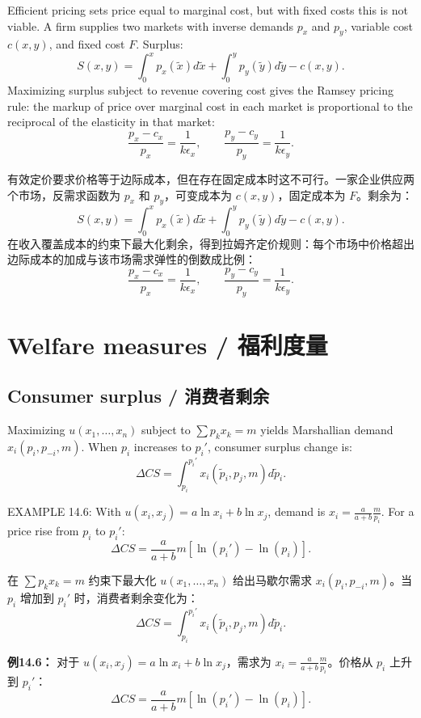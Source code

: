 \begin{original}
Efficient pricing sets price equal to marginal cost, but with fixed costs this is not viable. A firm supplies two markets with inverse demands $p_x$ and $p_y$, variable cost $c(x, y)$, and fixed cost $F$. Surplus:
\[
S(x, y) = \int_0^x p_x(\tilde{x})d\tilde{x} + \int_0^y p_y(\tilde{y})d\tilde{y} - c(x, y).
\]
Maximizing surplus subject to revenue covering cost gives the Ramsey pricing rule: the markup of price over marginal cost in each market is proportional to the reciprocal of the elasticity in that market:
\[
\frac{p_x - c_x}{p_x} = \frac{1}{k \epsilon_x}, \qquad \frac{p_y - c_y}{p_y} = \frac{1}{k \epsilon_y}.
\]
\end{original}
\begin{translation}
有效定价要求价格等于边际成本，但在存在固定成本时这不可行。一家企业供应两个市场，反需求函数为 $p_x$ 和 $p_y$，可变成本为 $c(x, y)$，固定成本为 $F$。剩余为：
\[
S(x, y) = \int_0^x p_x(\tilde{x})d\tilde{x} + \int_0^y p_y(\tilde{y})d\tilde{y} - c(x, y).
\]
在收入覆盖成本的约束下最大化剩余，得到拉姆齐定价规则：每个市场中价格超出边际成本的加成与该市场需求弹性的倒数成比例：
\[
\frac{p_x - c_x}{p_x} = \frac{1}{k \epsilon_x}, \qquad \frac{p_y - c_y}{p_y} = \frac{1}{k \epsilon_y}.
\]
\end{translation}

\section{Welfare measures / 福利度量}

\subsection{Consumer surplus / 消费者剩余}

\begin{original}
Maximizing $u(x_1,\dots, x_n)$ subject to $\sum p_k x_k = m$ yields Marshallian demand $x_i(p_i, p_{-i}, m)$. When $p_i$ increases to $p_i'$, consumer surplus change is:
\[
\Delta CS = \int_{p_i}^{p_i'} x_i(\tilde{p}_i, p_j, m) d\tilde{p}_i. \tag{14.8}
\]

EXAMPLE 14.6: With $u(x_i, x_j) = a\ln x_i + b\ln x_j$, demand is $x_i = \frac{a}{a+b}\frac{m}{p_i}$. For a price rise from $p_i$ to $p_i'$:
\[
\Delta CS = \frac{a}{a+b}m[\ln(p_i') - \ln(p_i)].
\]
\end{original}
\begin{translation}
在 $\sum p_k x_k = m$ 约束下最大化 $u(x_1,\dots, x_n)$ 给出马歇尔需求 $x_i(p_i, p_{-i}, m)$。当 $p_i$ 增加到 $p_i'$ 时，消费者剩余变化为：
\[
\Delta CS = \int_{p_i}^{p_i'} x_i(\tilde{p}_i, p_j, m) d\tilde{p}_i. \tag{14.8}
\]

\textbf{例14.6：} 对于 $u(x_i, x_j) = a\ln x_i + b\ln x_j$，需求为 $x_i = \frac{a}{a+b}\frac{m}{p_i}$。价格从 $p_i$ 上升到 $p_i'$：
\[
\Delta CS = \frac{a}{a+b}m[\ln(p_i') - \ln(p_i)].
\]
\end{translation}

